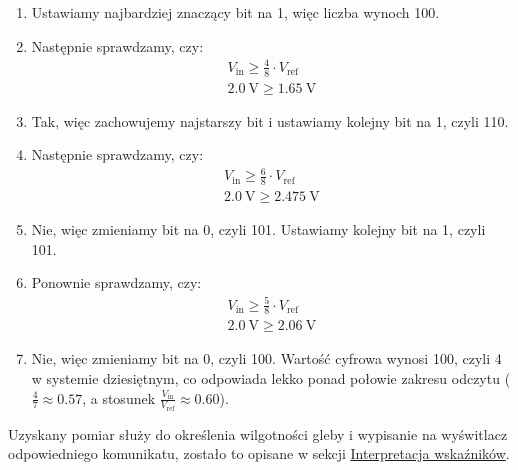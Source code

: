     \begin{enumerate}
        \item Ustawiamy najbardziej znaczący bit na 1, więc liczba wynoch 100.
        \item Następnie sprawdzamy, czy:
            \begin{align*}
                V_{\text{in}} \geq \frac{4}{8} \cdot V_{\text{ref}}\\
                \SI{2.0}{\volt} \geq \SI{1.65}{\volt}
            \end{align*}
        \item Tak, więc zachowujemy najstarszy bit i ustawiamy kolejny bit na 1, czyli 110.
        \item Następnie sprawdzamy, czy:
            \begin{align*}
                V_{\text{in}} \geq \frac{6}{8} \cdot V_{\text{ref}}\\
                \SI{2.0}{\volt} \geq \SI{2.475}{\volt}
            \end{align*}
        \item Nie, więc zmieniamy bit na 0, czyli 101. Ustawiamy kolejny bit na 1, czyli 101.
        \item Ponownie sprawdzamy, czy:
            \begin{align*}
                V_{\text{in}} \geq \frac{5}{8} \cdot V_{\text{ref}}\\
                \SI{2.0}{\volt} \geq \SI{2.06}{\volt}
            \end{align*}
        \item Nie, więc zmieniamy bit na 0, czyli 100. Wartość cyfrowa wynosi 100, czyli 4 w systemie dziesiętnym, co odpowiada lekko ponad połowie zakresu odczytu ($\frac{4}{7} \approx 0.57$, a stosunek $\frac{V_{\text{in}}}{V_{\text{ref}}} \approx 0.60$).
        
    \end{enumerate}
    Uzyskany pomiar służy do określenia wilgotności gleby i wypisanie na wyświtlacz odpowiedniego komunikatu, zostało to opisane w sekcji \hyperref[sec:wykorzystanie_ADC]{Interpretacja wskaźników}.
